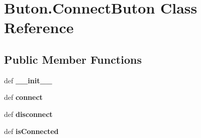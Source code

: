 \hypertarget{classButon_1_1ConnectButon}{\section{Buton.\+Connect\+Buton Class Reference}
\label{classButon_1_1ConnectButon}
}
\subsection*{Public Member Functions}
\begin{DoxyCompactItemize}
\item 
\hypertarget{classButon_1_1ConnectButon_acf802f45e38318e1784d66d6fe9b8e47}{def {\bfseries \+\_\+\+\_\+init\+\_\+\+\_\+}}\label{classButon_1_1ConnectButon_acf802f45e38318e1784d66d6fe9b8e47}

\item 
\hypertarget{classButon_1_1ConnectButon_a988f984422f32ca5b2300f3f8d741ef7}{def {\bfseries connect}}\label{classButon_1_1ConnectButon_a988f984422f32ca5b2300f3f8d741ef7}

\item 
\hypertarget{classButon_1_1ConnectButon_ab65e33859d27de3b86b9863a058c7984}{def {\bfseries disconnect}}\label{classButon_1_1ConnectButon_ab65e33859d27de3b86b9863a058c7984}

\item 
\hypertarget{classButon_1_1ConnectButon_a12d90ccbd5ded3f1563d56bd7ac7b5a7}{def {\bfseries is\+Connected}}\label{classButon_1_1ConnectButon_a12d90ccbd5ded3f1563d56bd7ac7b5a7}

\end{DoxyCompactItemize}
